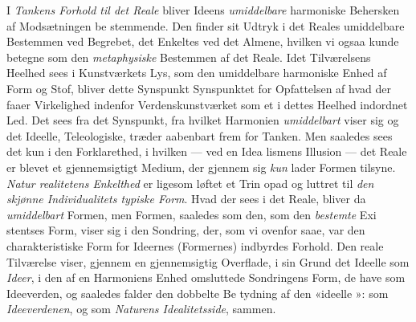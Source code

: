 I \emph{Tankens Forhold til det Reale} bliver Ideens
\emph{umiddelbare} harmoniske Behersken af Modsætningen be\-%
stemmende. Den finder sit Udtryk i det Reales umiddelbare
Bestemmen ved Begrebet, det Enkeltes ved det Almene, hvilken
vi ogsaa kunde betegne som den \emph{metaphysiske} Bestemmen
af det Reale. Idet Tilværelsens Heelhed sees i Kunstværkets
Lys, som den umiddelbare harmoniske Enhed af Form og Stof,
bliver dette Synspunkt Synspunktet for Opfattelsen af hvad
der faaer Virkelighed indenfor Verdenskunstværket som et i
dettes Heelhed indordnet Led. Det sees fra det Synspunkt,
fra hvilket Harmonien \emph{umiddelbart} viser sig og det Ideelle,
Teleologiske, træder aabenbart frem for Tanken. Men saaledes
sees det kun i den Forklarethed, i hvilken --- ved en Idea\-%
lismens Illusion --- det Reale er blevet et gjennemsigtigt
Medium, der gjennem sig \emph{kun} lader Formen tilsyne. \emph{Natur\-%
realitetens Enkelthed} er ligesom løftet et Trin opad og
luttret til \emph{den skjønne Individualitets typiske Form}.
Hvad der sees i det Reale, bliver da \emph{umiddelbart} Formen,
men Formen, saaledes som den, som den \emph{bestemte} Exi\-%
stentses Form, viser sig i den Sondring, der, som vi ovenfor
saae, var den charakteristiske Form for Ideernes (Formernes)
indbyrdes Forhold. Den reale Tilværelse viser, gjennem en
gjennemsigtig Overflade, i sin Grund det Ideelle som \emph{Ideer},
i den af en Harmoniens Enhed omsluttede Sondringens Form,
de have som Ideeverden, og saaledes falder den dobbelte Be\-%
tydning af den «ideelle »: som \emph{Ideeverdenen}, og
som \emph{Naturens Idealitetsside}, sammen.

